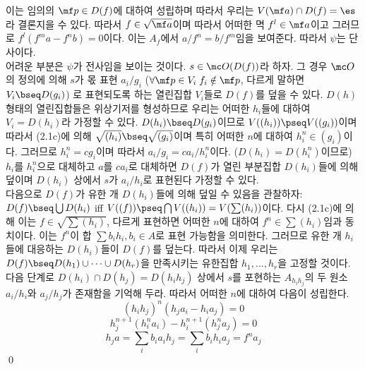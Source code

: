\begin{proposition}
{		이는 임의의 $\mf p\in D(f)$에 대하여 성립하며 따라서 우리는 $V(\mf a)\cap D(f)=\es$라 결론지을 수 있다.
		따라서 $f\in\sqrt{\mf a}$이며 따라서 어떠한 멱 $f^l\in\mf a$이고 그러므로 $f^l(f^ma-f^nb)=0$이다.
		이는 $A_f$에서 $a/f^n=b/f^m$임을 보여준다. 따라서 $\psi$는 단사이다.\\
		어려운 부분은 $\psi$가 전사임을 보이는 것이다. $s\in\mc O(D(f))$라 하자. 그 경우 $\mc O$의 정의에 의해 $s$가 몫 표현
		$a_i/g_i$ ($\forall\mf p\in V_i\;f_i\notin\mf p$, 다르게 말하면 $V_i\bseq D(g_i)$)%
		로 표현되도록 하는 열린집합 $V_i$들로 $D(f)$를 덮을 수 있다.
		$D(h)$ 형태의 열린집합들은 위상기저를 형성하므로 우리는 어떠한 $h_i$들에 대하여 $V_i=D(h_i)$라 가정할 수 있다.
		$D(h_i)\bseq D(g_i)$이므로 $V((h_i))\pseq V((g_i))$이며 따라서 (2.1c)에 의해 $\sqrt{(h_i)}\bseq\sqrt{(g_i)}$이며
		특히 어떠한 $n$에 대하여 $h_i^n\in(g_i)$이다. 그러므로 $h_i^n=cg_i$이며 따라서 $a_i/g_i=ca_i/h_i^n$이다.
		($D(h_i)=D(h_i^n)$이므로) $h_i$를 $h_i^n$으로 대체하고 $a$를 $ca_i$로 대체하면
		$D(f)$가 열린 부분집합 $D(h_i)$들에 의해 덮이며 $D(h_i)$ 상에서 $s$가 $a_i/h_i$로 표현된다 가정할 수 있다.\\
		다음으로 $D(f)$가 유한 개 $D(h_i)$들에 의해 덮일 수 있음을 관찰하자:
		$D(f)\bseq\bigcup D(h_i)$ iff $V((f))\pseq\bigcap V((h_i))=V(\sum(h_i))$이다.
		다시 (2.1c)에 의해 이는 $f\in\sqrt{\sum(h_i)}$, 다르게 표현하면 어떠한 $n$에  대하여 $f^n\in\sum(h_i)$임과 동치이다.
		이는 $f^n$이 합 $\sum b_ih_i,b_i\in A$로 표현 가능함을 의미한다.
		그러므로 유한 개 $h_i$들에 대응하는 $D(h_i)$들이 $D(f)$를 덮는다.
		따라서 이제 우리는 $D(f)\bseq D(h_1)\cup\cdots\cup D(h_r)$을 만족시키는 유한집합 $h_1,\ldots,h_r$을 고정할 것이다.\\
		다음 단계로 $D(h_i)\cap D(h_j)=D(h_ih_j)$ 상에서 $s$를 포현하는 $A_{h_ih_j}$의 두 원소
		$a_i/h_i$와 $a_j/h_j$가 존재함을 기억해 두라. 따라서 어떠한 $n$에 대하여 다음이 성립한다.}
		$$(h_ih_j)^n(h_ja_i-h_ia_j)=0$$
		$$h_j^{n+1}(h_i^na_i)-h_i^{n+1}(h_j^na_j)=0$$
		$$h_ja=\sum_ib_ia_ih_j=\sum_ib_ih_ia_j=f^na_j$$
		\qed
	\end{proposition}
	
